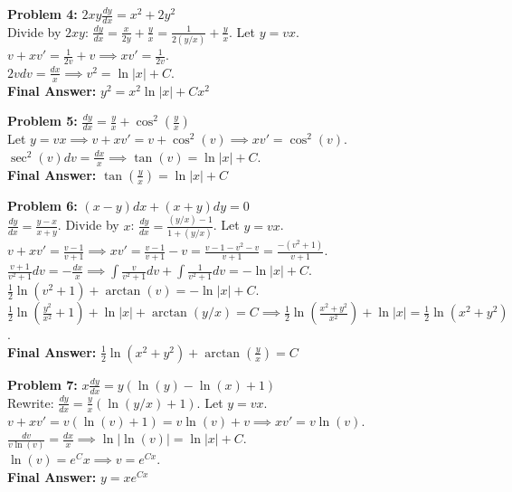 \documentclass[12pt]{article}
\begin{document}
\vspace{10pt}
\textbf{Problem 4:} $2xy \frac{dy}{dx} = x^2 + 2y^2$ \\
Divide by $2xy$: $\frac{dy}{dx} = \frac{x}{2y} + \frac{y}{x} = \frac{1}{2(y/x)} + \frac{y}{x}$. Let $y=vx$. \\
$v + xv' = \frac{1}{2v} + v \implies xv' = \frac{1}{2v}$. \\
$2v dv = \frac{dx}{x} \implies v^2 = \ln|x| + C$. \\
\textbf{Final Answer:} $y^2 = x^2 \ln|x| + C x^2$

\vspace{10pt}
\textbf{Problem 5:} $\frac{dy}{dx} = \frac{y}{x} + \cos^2\left(\frac{y}{x}\right)$ \\
Let $y=vx \implies v + xv' = v + \cos^2(v) \implies xv' = \cos^2(v)$. \\
$\sec^2(v) dv = \frac{dx}{x} \implies \tan(v) = \ln|x| + C$. \\
\textbf{Final Answer:} $\tan\left(\frac{y}{x}\right) = \ln|x| + C$

\vspace{10pt}
\textbf{Problem 6:} $(x-y)dx + (x+y)dy = 0$ \\
$\frac{dy}{dx} = \frac{y-x}{x+y}$. Divide by $x$: $\frac{dy}{dx} = \frac{(y/x)-1}{1+(y/x)}$. Let $y=vx$. \\
$v + xv' = \frac{v-1}{v+1} \implies xv' = \frac{v-1}{v+1} - v = \frac{v-1-v^2-v}{v+1} = \frac{-(v^2+1)}{v+1}$. \\
$\frac{v+1}{v^2+1} dv = -\frac{dx}{x} \implies \int \frac{v}{v^2+1} dv + \int \frac{1}{v^2+1} dv = -\ln|x| + C$. \\
$\frac{1}{2}\ln(v^2+1) + \arctan(v) = -\ln|x| + C$. \\
$\frac{1}{2}\ln\left(\frac{y^2}{x^2}+1\right) + \ln|x| + \arctan(y/x) = C \implies \frac{1}{2}\ln\left(\frac{x^2+y^2}{x^2}\right) + \ln|x| = \frac{1}{2}\ln(x^2+y^2)$. \\
\textbf{Final Answer:} $\frac{1}{2}\ln(x^2+y^2) + \arctan\left(\frac{y}{x}\right) = C$

\vspace{10pt}
\textbf{Problem 7:} $x \frac{dy}{dx} = y(\ln(y) - \ln(x) + 1)$ \\
Rewrite: $\frac{dy}{dx} = \frac{y}{x}(\ln(y/x) + 1)$. Let $y=vx$. \\
$v + xv' = v(\ln(v) + 1) = v\ln(v) + v \implies xv' = v\ln(v)$. \\
$\frac{dv}{v\ln(v)} = \frac{dx}{x} \implies \ln|\ln(v)| = \ln|x| + C$. \\
$\ln(v) = e^C x \implies v = e^{Cx}$. \\
\textbf{Final Answer:} $y = x e^{Cx}$
\end{document}
